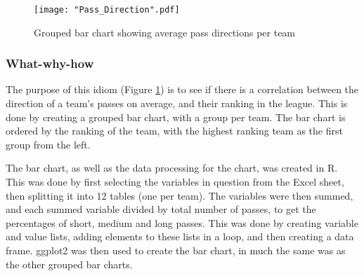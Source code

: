 \documentclass[Report.tex]{subfiles}
\begin{document}
\begin{figure}
\center
\texttt{[image: "Pass\_Direction".pdf]}
\caption{Grouped bar chart showing average pass directions per team}
\label{Fig:Pass_Direction} 
\end{figure}

\subsubsection{What-why-how}
The purpose of this idiom (Figure \ref{Fig:Pass_Direction}) is to see if there is a correlation between the
direction of a team's passes on average, and their ranking in the league. 
This is done by creating a grouped bar chart, with a group per team. The bar
chart is ordered by the ranking of the team, with the highest ranking team as
the first group from the left.

The bar chart, as well as the data processing for the chart, was created in R.
This was done by first selecting the variables in question from the Excel sheet,
then splitting it into 12 tables (one per team). The variables were then
summed, and each summed variable divided by total number of passes, to get the
percentages of short, medium and long passes. This was done by creating
variable and value lists, adding elements to these lists in a loop, and then
creating a data frame. 
ggplot2 was then used to create the bar chart, in much the same was as the other
grouped bar charts. 
\end{document}
